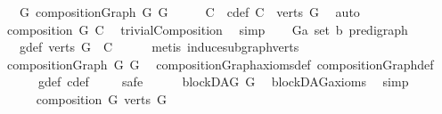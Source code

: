 \begin{isabellebody}
\ \ \ {\isachardoublequoteopen}{\isasymexists}G{\isacharprime}{\kern0pt}{\isachardot}{\kern0pt}\ compositionGraph\ G\ G{\isacharprime}{\kern0pt}{\isachardoublequoteclose}\isanewline
%
\isadelimproof
%
\endisadelimproof
%
\isatagproof
{}\isamarkupfalse%
\ {\isacharminus}{\kern0pt}\isanewline
\ \ \isamarkupfalse%
\ C\ \ c{\isacharunderscore}{\kern0pt}def{\isacharcolon}{\kern0pt}\ {\isachardoublequoteopen}C\ {\isacharequal}{\kern0pt}\ verts\ G{\isachardoublequoteclose}\ \isamarkupfalse%
\ auto\isanewline
\ \ \isamarkupfalse%
\ \isamarkupfalse%
\ {\isachardoublequoteopen}composition\ G\ C{\isachardoublequoteclose}\ \isamarkupfalse%
\ trivialComposition\ \isamarkupfalse%
\ simp\isanewline
\ \ \isamarkupfalse%
\ G{\isacharprime}{\kern0pt}{\isacharcolon}{\kern0pt}{\isacharcolon}{\kern0pt}{\isachardoublequoteopen}{\isacharparenleft}{\kern0pt}{\isacharprime}{\kern0pt}a\ set{\isacharcomma}{\kern0pt}\ {\isacharprime}{\kern0pt}b{\isacharparenright}{\kern0pt}\ pre{\isacharunderscore}{\kern0pt}digraph{\isachardoublequoteclose}\isanewline
\ \ \ g{\isacharprime}{\kern0pt}{\isacharunderscore}{\kern0pt}def{\isacharcolon}{\kern0pt}\ {\isachardoublequoteopen}verts\ G{\isacharprime}{\kern0pt}\ {\isacharequal}{\kern0pt}\ {\isacharbraceleft}{\kern0pt}C{\isacharbraceright}{\kern0pt}{\isachardoublequoteclose}\isanewline
\ \ \ \ \isamarkupfalse%
\ {\isacharparenleft}{\kern0pt}metis\ induce{\isacharunderscore}{\kern0pt}subgraph{\isacharunderscore}{\kern0pt}verts{\isacharparenright}{\kern0pt}\ \isanewline
\ \ \isamarkupfalse%
\ {\isachardoublequoteopen}compositionGraph\ G\ G{\isacharprime}{\kern0pt}{\isachardoublequoteclose}\ \isamarkupfalse%
\ compositionGraph{\isacharunderscore}{\kern0pt}axioms{\isacharunderscore}{\kern0pt}def\ compositionGraph{\isacharunderscore}{\kern0pt}def\isanewline
\ \ \ \ \ \ g{\isacharprime}{\kern0pt}{\isacharunderscore}{\kern0pt}def\ c{\isacharunderscore}{\kern0pt}def\ \isanewline
\ \ \isamarkupfalse%
\ safe\isanewline
\ \ \ \ \isamarkupfalse%
\ {\isachardoublequoteopen}blockDAG\ G{\isachardoublequoteclose}\ \isamarkupfalse%
\ blockDAG{\isacharunderscore}{\kern0pt}axioms\ \isamarkupfalse%
\ simp\isanewline
\ \ \isamarkupfalse%
\ \isanewline
\ \ \ \ \isamarkupfalse%
\ {\isachardoublequoteopen}composition\ G\ {\isacharparenleft}{\kern0pt}verts\ G{\isacharparenright}{\kern0pt}{\isachardoublequoteclose}\ \isamarkupfalse%

\end{isabellebody}
